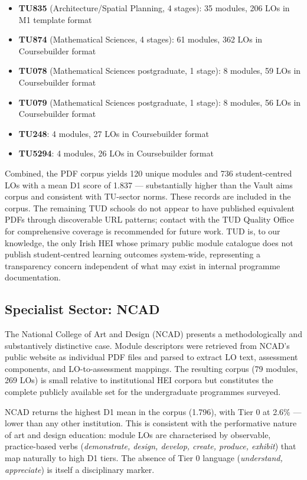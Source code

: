 \documentclass[12pt, a4paper]{article}
\begin{document}
\begin{itemize}
  \item \textbf{TU835} (Architecture/Spatial Planning, 4 stages): 35 modules, 206 LOs in M1 template format
  \item \textbf{TU874} (Mathematical Sciences, 4 stages): 61 modules, 362 LOs in Coursebuilder format
  \item \textbf{TU078} (Mathematical Sciences postgraduate, 1 stage): 8 modules, 59 LOs in Coursebuilder format
  \item \textbf{TU079} (Mathematical Sciences postgraduate, 1 stage): 8 modules, 56 LOs in Coursebuilder format
  \item \textbf{TU248}: 4 modules, 27 LOs in Coursebuilder format
  \item \textbf{TU5294}: 4 modules, 26 LOs in Coursebuilder format
\end{itemize}

Combined, the PDF corpus yields 120 unique modules and 736 student-centred LOs
with a mean D1 score of 1.837 --- substantially higher than the Vault aims corpus
and consistent with TU-sector norms. These records are included in the corpus.
The remaining TUD schools do not appear to have published equivalent PDFs through
discoverable URL patterns; contact with the TUD Quality Office for comprehensive
coverage is recommended for future work. TUD is, to our knowledge,
the only Irish HEI whose primary public module catalogue does not publish
student-centred learning outcomes system-wide, representing a transparency concern
independent of what may exist in internal programme documentation.

\subsection{Specialist Sector: NCAD}

The National College of Art and Design (NCAD) presents a methodologically and
substantively distinctive case. Module descriptors were retrieved from NCAD's public
website as individual PDF files and parsed to extract LO text, assessment components,
and LO-to-assessment mappings. The resulting corpus (79 modules, 269 LOs) is small
relative to institutional HEI corpora but constitutes the complete publicly available
set for the undergraduate programmes surveyed.

NCAD returns the highest D1 mean in the corpus (1.796), with Tier 0 at 2.6\% ---
lower than any other institution. This is consistent with the performative nature of
art and design education: module LOs are characterised by observable, practice-based
verbs (\textit{demonstrate, design, develop, create, produce, exhibit}) that map
naturally to high D1 tiers. The absence of Tier 0 language (\textit{understand,
appreciate}) is itself a disciplinary marker.
\end{document}
